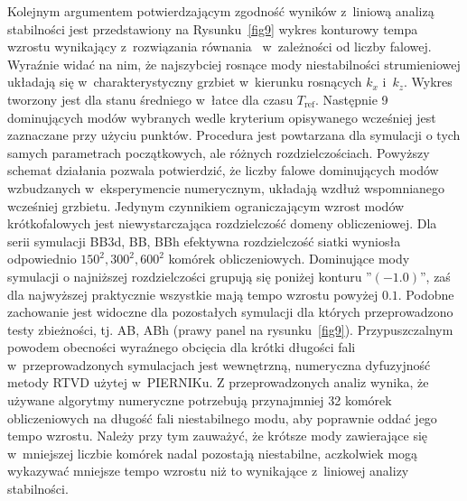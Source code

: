 \par Kolejnym argumentem potwierdzającym zgodność wyników z~liniową analizą
stabilności jest przedstawiony na Rysunku~\ref{fig9} wykres konturowy tempa
wzrostu wynikający z~rozwiązania równania~ w~zależności od
liczby falowej. Wyraźnie widać na nim, że najszybciej rosnące mody
niestabilności strumieniowej układają się w~charakterystyczny grzbiet w~kierunku
rosnących $k_x$ i~$k_z$.  Wykres tworzony jest dla stanu średniego w~łatce dla
czasu $T_{\textrm{ref}}$.  Następnie 9 dominujących modów wybranych wedle
kryterium opisywanego wcześniej jest zaznaczane przy użyciu punktów. Procedura
jest powtarzana dla symulacji o tych samych parametrach początkowych, ale
różnych rozdzielczościach.  Powyższy schemat działania pozwala potwierdzić, że
liczby falowe dominujących modów wzbudzanych w~eksperymencie numerycznym,
układają wzdłuż wspomnianego wcześniej grzbietu. Jedynym czynnikiem
ograniczającym wzrost modów krótkofalowych jest niewystarczająca rozdzielczość
domeny obliczeniowej. Dla serii symulacji BB3d, BB, BBh efektywna rozdzielczość
siatki wyniosła odpowiednio $150^2, 300^2, 600^2$ komórek obliczeniowych.
Dominujące mody symulacji o najniższej rozdzielczości grupują się poniżej
konturu ''$(-1.0)$'', zaś dla najwyższej praktycznie wszystkie mają tempo
wzrostu powyżej $0.1$. Podobne zachowanie jest widoczne dla pozostałych
symulacji dla których przeprowadzono testy zbieżności, tj. AB, ABh (prawy panel
na rysunku~\ref{fig9}). Przypuszczalnym powodem obecności wyraźnego obcięcia dla
krótki długości fali w~przeprowadzonych symulacjach jest wewnętrzną, numeryczna
dyfuzyjność metody RTVD użytej w~PIERNIKu. Z przeprowadzonych analiz wynika, że
używane algorytmy numeryczne potrzebują przynajmniej 32 komórek obliczeniowych
na długość fali niestabilnego modu, aby poprawnie oddać jego tempo wzrostu.
Należy przy tym zauważyć, że krótsze mody zawierające się w~mniejszej liczbie
komórek nadal pozostają niestabilne, aczkolwiek mogą wykazywać mniejsze tempo
wzrostu niż to wynikające z~liniowej analizy stabilności.
%
